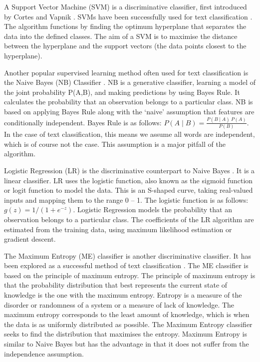 A Support Vector Machine (SVM) is a discriminative classifier, first introduced by Cortes and Vapnik \cite{Vapnik1995,  Vapnik21995}. SVMs have been successfully used for text classification \cite{Joachims1998, tong2001support}. The algorithm functions by finding the optimum hyperplane that separates the data into the defined classes. The aim of a SVM is to maximise the distance between the hyperplane and the support vectors (the data points closest to the hyperplane). 

Another popular supervised learning method often used for text classification is the Naive Bayes (NB) Classifier  \cite{NaiveBayes1998}. NB is a generative classifier, learning a model of the joint probability P(A,B), and making predictions by using Bayes Rule. It calculates the probability that an observation belongs to a particular class. NB is based on applying Bayes Rule along with the ‘naive’ assumption that features are conditionally independent. Bayes Rule is as follows:  \(P(A\mid B)=\frac{P(B\mid A)\:P(A)}{P(B)}\). In the case of text classification, this means we assume all words are independent, which is of course not the case. This assumption is a major pitfall of the algorithm. 

Logistic Regression (LR) is the discriminative counterpart to Naive Bayes \cite{ng2002discriminative}. It is a linear classifier. LR uses the logistic function, also known as the sigmoid function or logit function to model the data. This is an S-shaped curve, taking real-valued inputs and mapping them to the range 0 – 1. The logistic function is as follows: \(g(z)=1/(1+e^{-z})\). Logistic Regression models the probability that an observation belongs to a particular class. The coefficients of the LR algorithm are estimated from the training data, using maximum likelihood estimation or gradient descent.

The Maximum Entropy (ME) classifier is another discriminative classifier. It has been explored as a successful method of text classification \cite{MaxEnt1999}. The ME classifier is based on the principle of maximum entropy. The principle of maximum entropy is that the probability distribution that best represents the current state of knowledge is the one with the maximum entropy. Entropy is a measure of the disorder or randomness of a system or a measure of lack of knowledge. The maximum entropy corresponds to the least amount of knowledge, which is when the data is as uniformly distributed as possible. The Maximum Entropy classifier seeks to find the distribution that maximises the entropy. Maximum Entropy is similar to Naive Bayes but has the advantage in that it does not suffer from the independence assumption.

